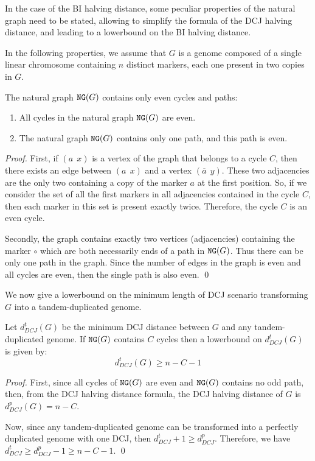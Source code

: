 \documentclass{llncs}
\newcommand{\fst}[1]{ \ensuremath{#1} }
\newcommand{\snd}[1]{ \ensuremath{\overline{#1}} }
\newcommand\aff[2]{\ensuremath{(\fst{#1}~~\fst{#2})}}
\newcommand\asf[2]{\ensuremath{(\snd{#1}~~\fst{#2})}}
\renewcommand{\NG}{\ensuremath{\mbox{\texttt{NG}}}}
\begin{document}
In the case of the BI halving distance, some peculiar properties of the natural graph need to be stated, allowing to simplify the formula of the DCJ halving distance, and leading to a lowerbound on the BI halving distance.


In the following properties, we assume that $G$ is a genome composed of a 
single linear chromosome containing $n$ distinct markers, each one present 
in two copies in $G$. 


\begin{property}
The natural graph $\NG(G)$ contains only even cycles and paths: 
\label{prop:EC}
\label{prop:1EP}
\begin{enumerate}
\item All cycles in the natural graph $\NG(G)$ are even.
\item The natural graph $\NG(G)$ contains only one path, and this path is even.
\end{enumerate}
\end{property}

\begin{proof}
    First, if \aff{a}{x} is a vertex of the
    graph that belongs to a cycle $C$, then there exists an edge between
    \aff{a}{x} and a vertex \asf{a}{y}. These two
    adjacencies are the only two containing a copy of the marker $a$ at the
    first position. So, if we consider the set of all the first markers in
    all adjacencies contained in the cycle $C$, then each marker in this set is
    present exactly twice. Therefore, the cycle $C$ is an even cycle.
  
    Secondly, the graph contains exactly two vertices (adjacencies) containing the
    marker $\circ$ which are both necessarily ends of a path in $\NG(G)$. Thus
   there can be only one path in the graph. Since the number of edges in the 
   graph is even and all cycles are even, then the single path is also even. \qed
\end{proof}


We now give a lowerbound on the minimum length of DCJ scenario transforming 
$G$ into a tandem-duplicated genome.

\begin{lemma}
    Let $d^t_{DCJ}(G)$  be the minimum DCJ distance between $G$ and any 
   tandem-duplicated genome. If $\NG(G)$ contains $C$ cycles then a 
   lowerbound on $d^t_{DCJ}(G)$ is given by:
    $$d^t_{DCJ}(G) \geq n - C - 1$$
\label{DCJdistLB}
\end{lemma}


\begin{proof}
    First, since all cycles  of $\NG(G)$ are even and $\NG(G)$ contains no odd 
    path, 
   then, from the DCJ halving distance formula, the DCJ halving distance of 
   $G$   is $d^p_{DCJ}(G) = n - C$.

    Now, since any  tandem-duplicated genome can be transformed into 
    a perfectly duplicated genome with one DCJ, then $d^t_{DCJ} + 1
    \geq d^p_{DCJ}$. Therefore, we have $ d^t_{DCJ} \geq d^p_{DCJ} - 1 \geq
    n - C - 1$.  \qed
\end{proof}
\end{document}
